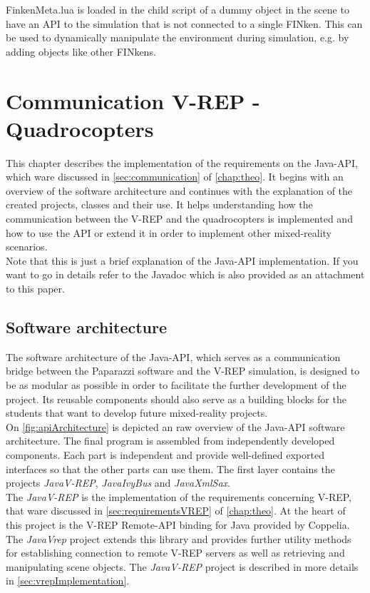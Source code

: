 FinkenMeta.lua is loaded in the child script of a dummy object in the scene  to have an API to the simulation that is not connected to a single FINken. This can be used to dynamically manipulate the environment during simulation, e.g. by adding objects like other FINkens.
\section{Communication V-REP - Quadrocopters}
\label{sec:commImplementation}

This chapter describes the implementation of the requirements on the Java-API, which ware discussed in \ref{sec:communication} of \ref{chap:theo}. It begins with an overview of the software architecture and continues with the explanation of the created projects, classes and their use. It helps understanding how the communication between the V-REP and the quadrocopters is implemented and how to use the API or extend it in order to implement other mixed-reality scenarios.\\
Note that this is just a brief explanation of the Java-API implementation. If you want to go in details refer to the Javadoc which is also provided as an attachment to this paper.

\subsection{Software architecture}

The software architecture of the Java-API, which serves as a communication bridge between the Paparazzi software and the V-REP simulation, is designed to be as modular as possible in order to facilitate the further development of the project. Its reusable components should also serve as a building blocks for the students that want to develop future mixed-reality projects. \\

On \ref{fig:apiArchitecture} is depicted an raw overview of the Java-API software architecture.
The final program is assembled from independently developed components. Each part is independent and provide well-defined exported interfaces so that the other parts can use them.
The first layer contains the projects \textit{JavaV-REP}, \textit{JavaIvyBus} and \textit{JavaXmlSax}.\\
The \textit{JavaV-REP} is the implementation of the requirements concerning V-REP, that ware discussed in \ref{sec:requirementsVREP} of \ref{chap:theo}. At the heart of this project is the V-REP Remote-API binding for Java provided by Coppelia. The \textit{JavaVrep} project extends this library and provides further utility methods for establishing connection to remote V-REP servers as well as retrieving and manipulating scene objects. The \textit{JavaV-REP} project is described in more details in \ref{sec:vrepImplementation}.\\

